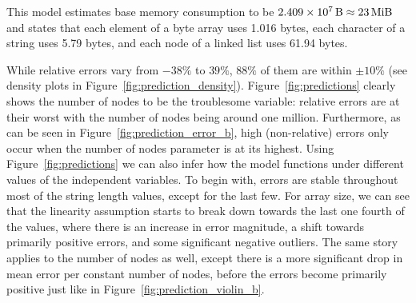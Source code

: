 \documentclass{article}
\begin{document}
This model estimates base memory consumption to be $\SI{2.409e7}{\byte} \approx
\SI{23}{\mebi\byte}$ and states that each element of a byte array uses 1.016
bytes, each character of a string uses 5.79 bytes, and each node of a linked
list uses 61.94 bytes.

While relative errors vary from $-38\%$ to $39\%$, $88\%$ of them are within
$\pm10\%$ (see density plots in Figure~\ref{fig:prediction_density}).
Figure~\ref{fig:predictions} clearly shows the number of nodes to be the
troublesome variable: relative errors are at their worst with the number of
nodes being around one million. Furthermore, as can be seen in
Figure~\ref{fig:prediction_error_b}, high (non-relative) errors only occur when
the number of nodes parameter is at its highest. Using
Figure~\ref{fig:predictions} we can also infer how the model functions under
different values of the independent variables. To begin with, errors are stable
throughout most of the string length values, except for the last few. For array
size, we can see that the linearity assumption starts to break down towards the
last one fourth of the values, where there is an increase in error magnitude, a
shift towards primarily positive errors, and some significant negative outliers.
The same story applies to the number of nodes as well, except there is a more
significant drop in mean error per constant number of nodes, before the errors
become primarily positive just like in Figure~\ref{fig:prediction_violin_b}.
\end{document}
